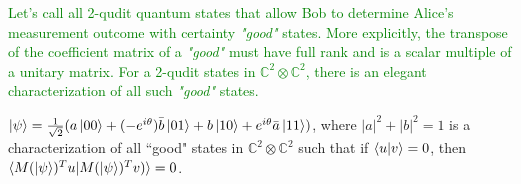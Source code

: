 \textcolor{green}{Let's call all 2-qudit quantum states that allow Bob to determine Alice's measurement outcome with certainty \emph{"good"} states. More explicitly, the transpose of the coefficient matrix of a \emph{"good"} must have full rank and is a scalar multiple of a unitary matrix. For a 2-qudit states in $\mathbb{C}^2 \otimes \mathbb{C}^2$, there is an elegant characterization of all such \emph{"good"} states.} 
\begin{corollary}
$\ket{\psi}=\frac{1}{\sqrt{2}}(a\ket{00}+(-e^{i\theta})\Bar{b}\ket{01}+b\ket{10}+e^{i\theta}\Bar{a}\ket{11})$, where $|a|^2+|b|^2=1$ is a characterization of all “good" states in $\mathbb{C}^2 \otimes \mathbb{C}^2$ such that if $\braket{u|v}=0$, then $\braket{M(\ket{\psi})^Tu|M(\ket{\psi})^Tv)}=0$.
\end{corollary}


